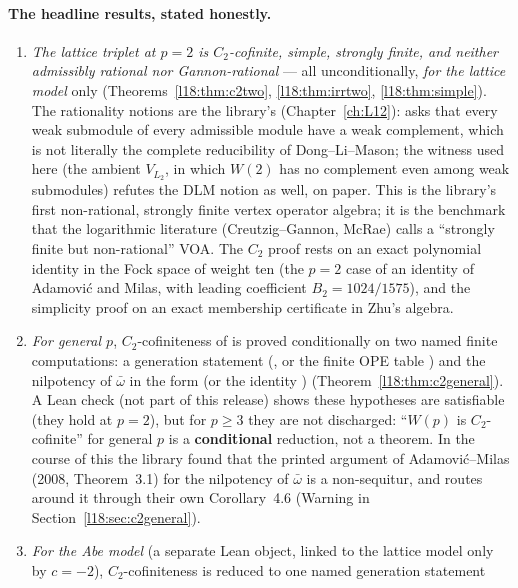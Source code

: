 \paragraph{The headline results, stated honestly.}
\begin{enumerate}
\item \emph{The lattice triplet at $p=2$ is $C_2$-cofinite, simple, strongly finite, and neither
  admissibly rational nor Gannon-rational} --- all unconditionally, \emph{for the lattice model}
   only (Theorems~\ref{l18:thm:c2two}, \ref{l18:thm:irrtwo}, \ref{l18:thm:simple}). The
  rationality notions are the library's (Chapter~\ref{ch:L12}):  asks that every weak submodule
  of every admissible module have a weak complement, which is not literally the complete reducibility of
  Dong--Li--Mason; the witness used here (the ambient $V_{L_2}$, in which $W(2)$ has no complement even among weak
  submodules) refutes the DLM notion as well, on paper. This is the
  library's first non-rational, strongly finite vertex operator algebra; it is the benchmark that
  the logarithmic literature (Creutzig--Gannon, McRae) calls a ``strongly finite but non-rational''
  VOA. The $C_2$ proof rests on an exact polynomial identity in the Fock space of weight ten
  (the $p=2$ case of an identity of Adamovi\'c and Milas, with leading coefficient
  $B_2=1024/1575$), and the simplicity proof on an exact membership certificate in Zhu's algebra.
\item \emph{For general $p$}, $C_2$-cofiniteness of  is proved conditionally
  on two named finite computations: a generation statement (, or the finite OPE
  table ) and the nilpotency of $\bar\omega$ in the form
   (or the identity )
  (Theorem~\ref{l18:thm:c2general}). A Lean check (not part of this release) shows these hypotheses are satisfiable (they
  hold at $p=2$), but for $p\ge3$ they are not discharged: ``$W(p)$ is $C_2$-cofinite'' for general $p$ is a
  \textbf{conditional} reduction, not a theorem. In the course of this the library found that the printed argument of
  Adamovi\'c--Milas (2008, Theorem~3.1) for the nilpotency of $\bar\omega$ is a non-sequitur, and
  routes around it through their own Corollary~4.6 (Warning in Section~\ref{l18:sec:c2general}).
\item \emph{For the Abe model} (a separate Lean object, linked to the lattice model only by $c=-2$),
  $C_2$-cofiniteness is reduced to one named generation statement

\end{enumerate}
